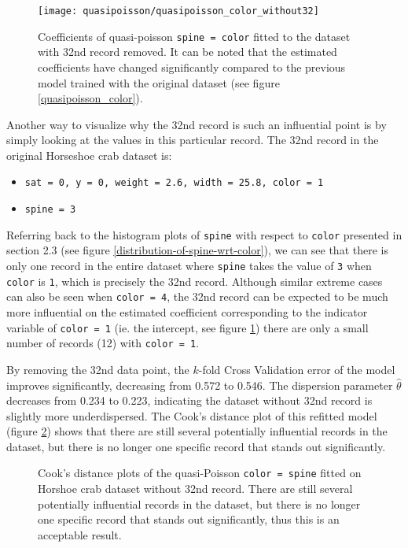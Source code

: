 \documentclass[a4paper, 12pt]{article}
\begin{document}
\begin{figure}[H]
\begin{center}
\texttt{[image: quasipoisson/quasipoisson\_color\_without32]}
\caption{Coefficients of quasi-poisson \texttt{spine = color} fitted to the dataset with 32nd record removed. It can be noted that the estimated coefficients have changed significantly compared to the previous model trained with the original dataset (see figure \ref{quasipoisson_color}).}
\label{quasipoisson_outlier_removed}
\end{center}
\end{figure}

Another way to visualize why the 32nd record is such an influential point is by simply looking at the values in this particular record. The 32nd record in the original Horseshoe crab dataset is:
\begin{itemize}
  \item \texttt{sat = 0, y = 0, weight = 2.6, width = 25.8, color = 1}
    \item \texttt{spine = 3}
\end{itemize}

Referring back to the histogram plots of \texttt{spine} with respect to \texttt{color} presented in section 2.3 (see figure \ref{distribution-of-spine-wrt-color}), we can see that there is only one record in the entire dataset where \texttt{spine} takes the value of \texttt{3} when \texttt{color} is \texttt{1}, which is precisely the 32nd record. Although similar extreme cases can also be seen when \texttt{color = 4}, the 32nd record can be expected to be much more influential on the estimated coefficient corresponding to the indicator variable of \texttt{color = 1} (ie. the intercept, see figure \ref{quasipoisson_outlier_removed}) there are only a small number of records (12) with \texttt{color = 1}.

By removing the 32nd data point, the $k$-fold Cross Validation error of the model improves significantly, decreasing from 0.572 to 0.546. The dispersion parameter $\hat{\theta}$ decreases from 0.234 to 0.223, indicating the dataset without 32nd record is slightly more underdispersed. The Cook's distance plot of this refitted model (figure \ref{quasipoisson-cooks-distance-without32}) shows that there are still several potentially influential records in the dataset, but there is no longer one specific record that stands out significantly.

\begin{figure}[H]
    \centering
    \qquad
    \caption{Cook's distance plots of the quasi-Poisson \texttt{color = spine} fitted on Horshoe crab dataset without 32nd record. There are still several potentially influential records in the dataset, but there is no longer one specific record that stands out significantly, thus this is an acceptable result.}
    \label{quasipoisson-cooks-distance-without32}
\end{figure}
\end{document}
